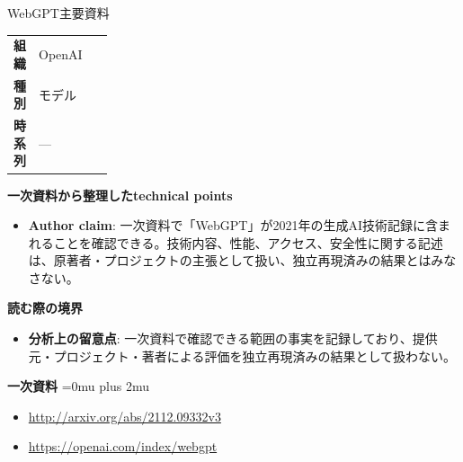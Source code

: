 \begin{technicalnote}{WebGPT}{主要資料}
\begingroup
\begin{tabularx}{\linewidth}{@{}>{\bfseries}p{0.22\linewidth}X@{}}
組織 & OpenAI \\
種別 & モデル \\
時系列 & — \\
\end{tabularx}
\smallskip
{\bfseries 一次資料から整理したtechnical points}
\begin{itemize}[leftmargin=1.5em,itemsep=0.35em]
\item \textbf{Author claim}: 一次資料で「WebGPT」が2021年の生成AI技術記録に含まれることを確認できる。技術内容、性能、アクセス、安全性に関する記述は、原著者・プロジェクトの主張として扱い、独立再現済みの結果とはみなさない。
\end{itemize}
\begin{minipage}{\linewidth}
{\bfseries 読む際の境界}
\begin{itemize}[leftmargin=1.5em,itemsep=0.35em]
\item \textbf{分析上の留意点}: 一次資料で確認できる範囲の事実を記録しており、提供元・プロジェクト・著者による評価を独立再現済みの結果として扱わない。
\end{itemize}
\begin{samepage}
{\bfseries 一次資料}
\begingroup\sloppy
\Urlmuskip=0mu plus 2mu\relax
\begin{itemize}[leftmargin=1.5em,itemsep=0.25em]
\item {\scriptsize\url{http://arxiv.org/abs/2112.09332v3}}
\item {\scriptsize\url{https://openai.com/index/webgpt}}
\end{itemize}
\endgroup
\end{samepage}
\end{minipage}
\endgroup
\end{technicalnote}
\medskip

